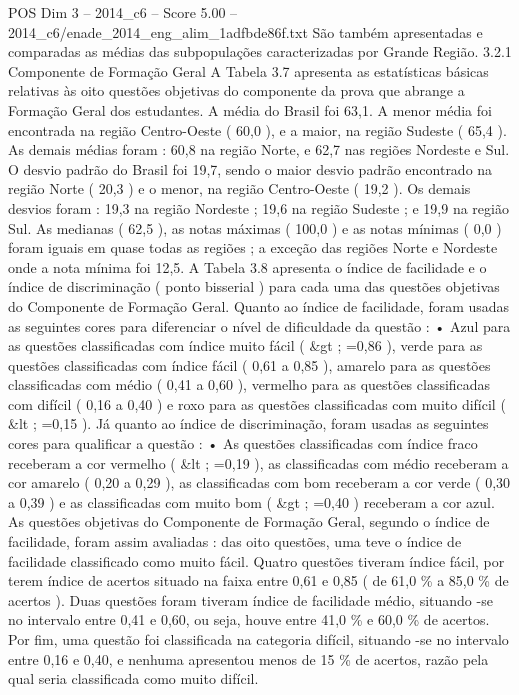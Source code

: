 \begin{textsample}{POS Dim 3 – 2014\_c6 – Score 5.00 – 2014\_c6/enade\_2014\_eng\_alim\_1adfbde86f.txt}
São também apresentadas e comparadas as médias das subpopulações caracterizadas por Grande Região. 3.2.1 Componente de Formação Geral A Tabela 3.7 apresenta as estatísticas básicas relativas às oito questões objetivas do componente da prova que abrange a Formação Geral dos estudantes.
A média do Brasil foi 63,1.
A menor média foi encontrada na região Centro-Oeste ( 60,0 ), e a maior, na região Sudeste ( 65,4 ).
As demais médias foram : 60,8 na região Norte, e 62,7 nas regiões Nordeste e Sul.
O desvio padrão do Brasil foi 19,7, sendo o maior desvio padrão encontrado na região Norte ( 20,3 ) e o menor, na região Centro-Oeste ( 19,2 ).
Os demais desvios foram : 19,3 na região Nordeste ; 19,6 na região Sudeste ; e 19,9 na região Sul.
As medianas ( 62,5 ), as notas máximas ( 100,0 ) e as notas mínimas ( 0,0 ) foram iguais em quase todas as regiões ; a exceção das regiões Norte e Nordeste onde a nota mínima foi 12,5.
A Tabela 3.8 apresenta o índice de facilidade e o índice de discriminação ( ponto bisserial ) para cada uma das questões objetivas do Componente de Formação Geral.
Quanto ao índice de facilidade, foram usadas as seguintes cores para diferenciar o nível de dificuldade da questão : • Azul para as questões classificadas com índice muito fácil ( \&gt ; =0,86 ), verde para as questões classificadas com índice fácil ( 0,61 a 0,85 ), amarelo para as questões classificadas com médio ( 0,41 a 0,60 ), vermelho para as questões classificadas com difícil ( 0,16 a 0,40 ) e roxo para as questões classificadas com muito difícil ( \&lt ; =0,15 ).
Já quanto ao índice de discriminação, foram usadas as seguintes cores para qualificar a questão : • As questões classificadas com índice fraco receberam a cor vermelho ( \&lt ; =0,19 ), as classificadas com médio receberam a cor amarelo ( 0,20 a 0,29 ), as classificadas com bom receberam a cor verde ( 0,30 a 0,39 ) e as classificadas com muito bom ( \&gt ; =0,40 ) receberam a cor azul.
As questões objetivas do Componente de Formação Geral, segundo o índice de facilidade, foram assim avaliadas : das oito questões, uma teve o índice de facilidade classificado como muito fácil.
Quatro questões tiveram índice fácil, por terem índice de acertos situado na faixa entre 0,61 e 0,85 ( de 61,0 \% a 85,0 \% de acertos ).
Duas questões foram tiveram índice de facilidade médio, situando -se no intervalo entre 0,41 e 0,60, ou seja, houve entre 41,0 \% e 60,0 \% de acertos.
Por fim, uma questão foi classificada na categoria difícil, situando -se no intervalo entre 0,16 e 0,40, e nenhuma apresentou menos de 15 \% de acertos, razão pela qual seria classificada como muito difícil.

\end{textsample}

